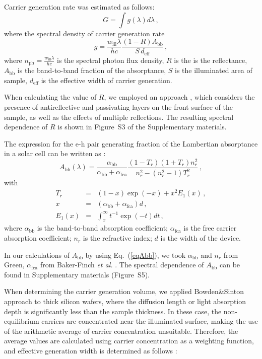 \documentclass{WileyMSP-template}
\begin{document}
Carrier generation rate was estimated as follows:
\begin{equation}
\label{eqGint}
G=\int g(\lambda) d\lambda\,,
\end{equation}
where the spectral density of carrier generation rate
\begin{equation}
\label{eqGspectr}
g=\frac{w_\mathrm{ill}\lambda}{hc}\frac{(1-R)A_\mathrm{bb}}{S\,d_\mathrm{eff}}\,,
\end{equation}
where $n_\mathrm{ph}=\frac{w_\mathrm{ill}\lambda}{hc}$ is the spectral photon flux density,
$R$ is the is the reflectance,
$A_\mathrm{bb}$ is the band-to-band fraction of the absorptance,
$S$ is the illuminated area of sample,
$d_\mathrm{eff}$ is the effective width of carrier generation.

When calculating the value of $R$, we employed an approach \cite{KostRefl2000},
which considers the presence of antireflective and passivating layers on the front surface of the sample,
as well as the effects of multiple reflections.
The resulting spectral dependence of $R$ is shown in Figure~S3 of the Supplementary materials.

The expression for the e-h pair generating fraction of the Lambertian absorptance in a solar cell
can be written as \cite{Schaefer2018}:
\begin{equation}
\label{eqAbb}
A_\mathrm{bb}(\lambda)=\frac{\alpha_\mathrm{bb}}{\alpha_\mathrm{bb}+\alpha_\mathrm{fca}}\frac{(1-T_r)(1+T_r)n_r^2}{n_r^2-(n_r^2-1)T_r^2}\,,
\end{equation}
with
\begin{eqnarray*}
T_r&=&(1-x)\exp(-x)+x^2E_1(x)\,,\\
x&=&(\alpha_\mathrm{bb}+\alpha_\mathrm{fca})d\,,\\
E_1(x)&=&\int_x^\infty t^{-1}\exp(-t)dt\,,
\end{eqnarray*}
where
$\alpha_\mathrm{bb}$ is the band-to-band absorption coefficient;
$\alpha_\mathrm{fca}$ is the free carrier absorption coefficient;
$n_r$ is the refractive index;
$d$ is the width of the device.

In our calculations of $A_\mathrm{bb}$ by using Eq.~(\ref{eqAbb}), we took  $\alpha_\mathrm{bb}$ and
$n_r$ from Green\cite{Green2022}, $\alpha_\mathrm{fca}$  from Baker-Finch \emph{et al.} \cite{SiFCA}.
The spectral dependence of $A_\mathrm{bb}$ can be found in Supplementary materials (Figure~S5).

When determining the carrier generation volume, we applied Bowden\&Sinton  approach \cite{Bowden2007} to thick silicon wafers,
where the diffusion length or light absorption depth is significantly less than the sample thickness.
In these case, the non-equilibrium carriers are concentrated near the illuminated surface,
making the use of the arithmetic average of carrier concentration unsuitable.
Therefore, the average values are calculated using carrier concentration as a weighting function,
and effective generation width is determined as follows \cite{Bowden2007}:
\end{document}
